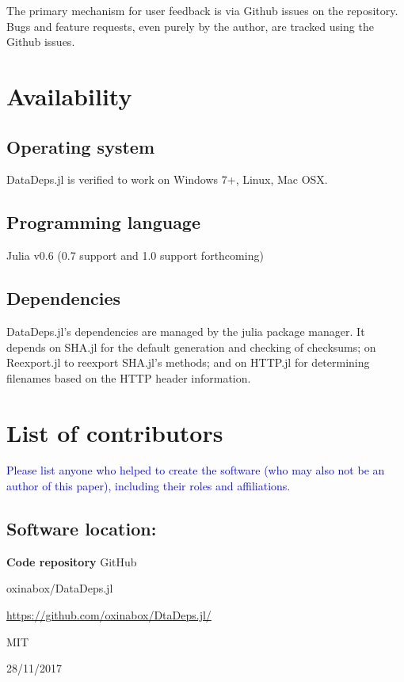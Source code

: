 \documentclass[dvinames]{jors}
\begin{document}
The primary mechanism for user feedback is via Github issues on the repository.
Bugs and feature requests, even purely by the author, are tracked using the Github issues.


\section{Availability}
\subsection{Operating system}
DataDeps.jl is verified to work on Windows 7+, Linux, Mac OSX.

\subsection{Programming language}
Julia v0.6 (0.7 support and 1.0 support forthcoming)

\subsection{Dependencies}
DataDeps.jl's dependencies are managed by the julia package manager.
It depends on SHA.jl for the default generation and checking of checksums; 
on Reexport.jl to reexport SHA.jl's methods;
and on HTTP.jl for determining filenames based on the HTTP header information.

\section*{List of contributors}

\textcolor{blue}{Please list anyone who helped to create the software (who may also not be an author of this paper), including their roles and affiliations.}

\subsection{Software location:}

{\bf Code repository} GitHub

\begin{description}[noitemsep,topsep=0pt]
	\item[Name:] oxinabox/DataDeps.jl
	\item[Persistent identifier:] \url{https://github.com/oxinabox/DtaDeps.jl/}
	\item[Licence:] MIT
	\item[Date published:] 28/11/2017
\end{description}
\end{document}
